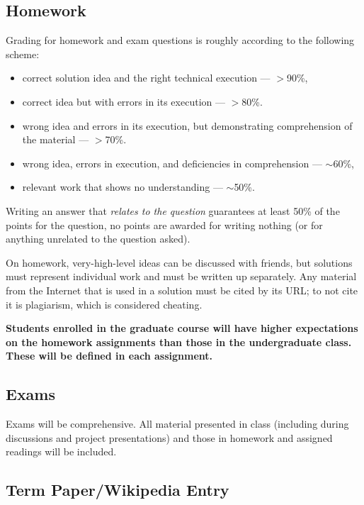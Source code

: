 \documentclass[12pt]{scrartcl}
\begin{document}
\subsection{Homework }

Grading for homework and exam questions is roughly according to the following scheme:
\begin{itemize}
\item correct solution idea and the right technical execution --- $>$90\%, 
\item correct idea but with errors in its execution --- $>$80\%. 
\item wrong idea and errors in its execution, but demonstrating comprehension of the material --- $>$70\%. 
\item wrong idea, errors in execution, and deficiencies in comprehension --- $\sim$60\%, 
\item relevant work that shows no understanding --- $\sim$50\%.
\end{itemize}
Writing an answer that \emph{relates to the question} guarantees at least 50\% of the points for the question, 
no points are awarded for writing nothing (or for anything unrelated to the question asked).

On homework, very-high-level ideas can be discussed with friends, but solutions must represent individual work and must be written up separately. 
Any material from the Internet that is used in a solution must be cited by its URL; to not cite it is plagiarism, which is considered cheating.

\textbf{Students enrolled in the graduate course will have higher expectations on the homework assignments than those in the undergraduate class. 
These will be defined in each assignment. }

\subsection{Exams}

Exams will be comprehensive. 
All material presented in class (including during discussions and project presentations) 
and those in homework and assigned readings will be included.

\subsection{Term Paper/Wikipedia Entry}
\end{document}

